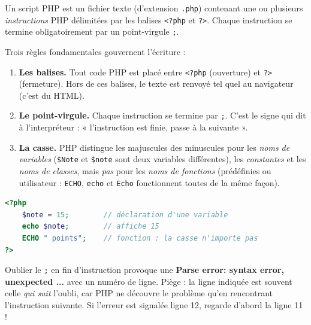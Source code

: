 \documentclass[11pt]{article}
\newcommand{\cle}[1]{{\popxbold\color{popdark}#1}}
\newcounter{popsec}
\newcounter{popsub}
\newcommand{\courssub}[1]{%
  \stepcounter{popsub}%
  \par\vspace{9pt}\noindent{\popxbold\fontsize{11.5}{13}\selectfont\color{popink}{\color{poporange}\thepopsec.\thepopsub}\hspace{6pt}#1}\par\nopagebreak\vspace{4pt}
}
\begin{document}
\courssub{Anatomie d'un script PHP}

\begin{definition}
Un \cle{script PHP} est un fichier texte (d'extension \texttt{.php}) contenant une ou plusieurs \emph{instructions} PHP délimitées par les balises \texttt{<?php} et \texttt{?>}. Chaque instruction se termine obligatoirement par un \cle{point-virgule} \texttt{;}.
\end{definition}

Trois règles fondamentales gouvernent l'écriture :

\begin{enumerate}
\item \textbf{Les balises.} Tout code PHP est placé entre \texttt{<?php} (ouverture) et \texttt{?>} (fermeture). Hors de ces balises, le texte est renvoyé tel quel au navigateur (c'est du HTML).
\item \textbf{Le point-virgule.} Chaque instruction se termine par \texttt{;}. C'est le signe qui dit à l'interpréteur : « l'instruction est finie, passe à la suivante ».
\item \textbf{La casse.} PHP distingue les majuscules des minuscules pour les \emph{noms de variables} (\texttt{\$Note} et \texttt{\$note} sont deux variables différentes), les \emph{constantes} et les \emph{noms de classes}, mais \emph{pas} pour les \emph{noms de fonctions} (prédéfinies ou utilisateur : \texttt{ECHO}, \texttt{echo} et \texttt{Echo} fonctionnent toutes de la même façon).
\end{enumerate}

\begin{exemplebox}
\begin{lstlisting}[language=Php]
<?php
    $note = 15;        // déclaration d'une variable
    echo $note;        // affiche 15
    ECHO " points";    // fonction : la casse n'importe pas
?>
\end{lstlisting}
\end{exemplebox}

\begin{attention}
Oublier le \texttt{;} en fin d'instruction provoque une \textbf{Parse error: syntax error, unexpected ...} avec un numéro de ligne. Piège : la ligne indiquée est souvent celle \emph{qui suit} l'oubli, car PHP ne découvre le problème qu'en rencontrant l'instruction suivante. Si l'erreur est signalée ligne 12, regarde d'abord la ligne 11 !
\end{attention}
\end{document}
